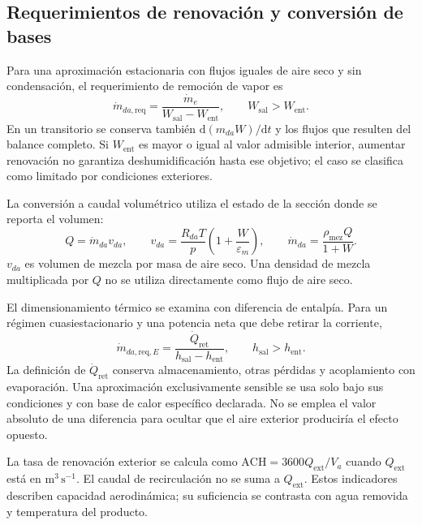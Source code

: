 \subsection{Requerimientos de renovación y conversión de bases}

Para una aproximación estacionaria con flujos iguales de aire seco y sin condensación, el requerimiento de remoción de vapor es
\begin{equation}
\dot m_{da,\mathrm{req}}=
\frac{\dot m_e}{W_{\mathrm{sal}}-W_{\mathrm{ent}}},
\qquad W_{\mathrm{sal}}>W_{\mathrm{ent}}.
\label{met:caudal_requerido_vapor}
\end{equation}
En un transitorio se conserva también $\mathrm d(m_{da}W)/\mathrm dt$ y los flujos que resulten del balance completo. Si $W_{\mathrm{ent}}$ es mayor o igual al valor admisible interior, aumentar renovación no garantiza deshumidificación hasta ese objetivo; el caso se clasifica como limitado por condiciones exteriores.

La conversión a caudal volumétrico utiliza el estado de la sección donde se reporta el volumen:
\begin{equation}
Q=\dot m_{da}v_{da},
\qquad
v_{da}=\frac{R_{da}T}{p}
\left(1+\frac{W}{\varepsilon_m}\right),
\qquad
\dot m_{da}=\frac{\rho_{\mathrm{mez}}Q}{1+W}.
\label{met:conversion_caudal}
\end{equation}
$v_{da}$ es volumen de mezcla por masa de aire seco. Una densidad de mezcla multiplicada por $Q$ no se utiliza directamente como flujo de aire seco.

El dimensionamiento térmico se examina con diferencia de entalpía. Para un régimen cuasiestacionario y una potencia neta que debe retirar la corriente,
\begin{equation}
\dot m_{da,\mathrm{req},E}
=\frac{\dot Q_{\mathrm{ret}}}
{h_{\mathrm{sal}}-h_{\mathrm{ent}}},
\qquad h_{\mathrm{sal}}>h_{\mathrm{ent}}.
\label{met:caudal_requerido_energia}
\end{equation}
La definición de $\dot Q_{\mathrm{ret}}$ conserva almacenamiento, otras pérdidas y acoplamiento con evaporación. Una aproximación exclusivamente sensible se usa solo bajo sus condiciones y con base de calor específico declarada. No se emplea el valor absoluto de una diferencia para ocultar que el aire exterior produciría el efecto opuesto.

La tasa de renovación exterior se calcula como $\mathrm{ACH}=3600Q_{\mathrm{ext}}/V_a$ cuando $Q_{\mathrm{ext}}$ está en $\mathrm{m^3\,s^{-1}}$. El caudal de recirculación no se suma a $Q_{\mathrm{ext}}$. Estos indicadores describen capacidad aerodinámica; su suficiencia se contrasta con agua removida y temperatura del producto.

